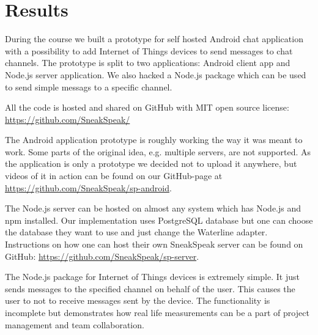 \section{Results}
During the course we built a prototype for self hosted Android chat application with a possibility to add Internet of Things devices to send messages to chat channels. The prototype is split to two applications: Android client app and Node.js server application. We also hacked a Node.js package which can be used to send simple messags to a specific channel.

All the code is hosted and shared on GitHub with MIT open source license: \url{https://github.com/SneakSpeak/}

The Android application prototype is roughly working the way it was meant to work. Some parts of the original idea, e.g. multiple servers, are not supported. As the application is only a prototype we decided not to upload it anywhere, but videos of it in action can be found on our GitHub-page at \url{https://github.com/SneakSpeak/sp-android}.

The Node.js server can be hosted on almost any system which has Node.js and npm installed. Our implementation uses PostgreSQL database but one can choose the database they want to use and just change the Waterline adapter. Instructions on how one can host their own SneakSpeak server can be found on GitHub: \url{https://github.com/SneakSpeak/sp-server}.

The Node.js package for Internet of Things devices is extremely simple. It just sends messages to the specified channel on behalf of the user. This causes the user to not to receive messages sent by the device. The functionality is incomplete but demonstrates how real life measurements can be a part of project management and team collaboration. 